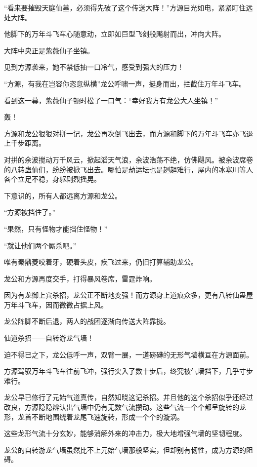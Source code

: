 
\begin{this_body}

“看来要摧毁天庭仙墓，必须得先破了这个传送大阵！”方源目光如电，紧紧盯住远处大阵。

他脚下的万年斗飞车心随意动，立即如巨型飞剑般飚射而出，冲向大阵。

大阵中央正是紫薇仙子坐镇。

见到方源袭来，她不禁低抽一口冷气，感受到强大的压力！

“方源，有我在岂容你恣意纵横”龙公呼啸一声，挺身而出，拦截住万年斗飞车。

看到这一幕，紫薇仙子顿时松了一口气：“幸好我方有龙公大人坐镇！”

轰！

方源和龙公狠狠对拼一记，龙公再次倒飞出去，而方源和脚下的万年斗飞车亦飞退上千步距离。

对拼的余波搅动万千风云，掀起滔天气浪，余波浩荡不绝，仿佛飓风。被余波席卷的八转蛊仙们，纷纷被掀飞出去。哪怕是劫运坛也是趔趄难行，屋内的冰塞川等人各个立足不稳，身躯剧烈摇晃。

下意识的，所有人都远离方源和龙公。

“方源被挡住了。”

“果然，只有怪物才能挡住怪物！”

“就让他们两个厮杀吧。”

唯有秦鼎菱咬着牙，硬着头皮，疾飞过来，仍旧打算辅助龙公。

龙公和方源再度交手，打得暴风卷席，雷霆炸响。

因为有龙御上宾杀招，龙公正不断地变强！而方源身上道痕众多，更有八转仙蛊屋万年斗飞车，因而微微占据上风。

龙公阵脚不断后退，两人的战团逐渐向传送大阵靠拢。

仙道杀招——自转游龙气墙！

迫不得已之下，龙公低呼一声，双臂一展，一道磅礴的无形气墙横亘在方源面前。

方源驾驭万年斗飞车往前飞冲，强行突入了数十步后，终究被气墙挡下，几乎寸步难行。

龙公早已修行了元始气道真传，自然知晓这记杀招。并且他的这个杀招似乎还经过改良，方源隐隐辨认出气墙中仍有无数气流攒动。这些气流一个个都呈旋转的龙形，龙首不断地围绕着龙尾飞速旋转，形成一个个的漩涡。

这些龙形气流十分玄妙，能够消解外来的冲击力，极大地增强气墙的坚韧程度。

龙公的自转游龙气墙虽然比不上元始气墙那般坚实，但却别有韧性，成为方源的阻碍。


\end{this_body}
